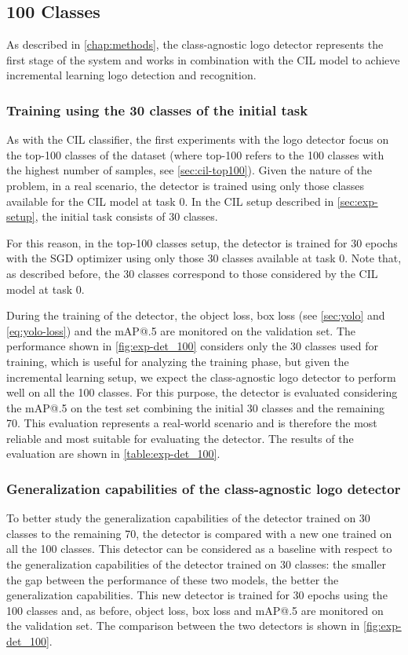 \subsection{100 Classes}

As described in \autoref{chap:methods}, the class-agnostic logo detector represents the first stage of the system and works in combination with the CIL model to achieve incremental learning logo detection and recognition.

\subsubsection{Training using the 30 classes of the initial task}
As with the CIL classifier, the first experiments with the logo detector focus on the top-100 classes of the dataset (where top-100 refers to the 100 classes with the highest number of samples, see \autoref{sec:cil-top100}).
Given the nature of the problem, in a real scenario, the detector is trained using only those classes available for the CIL model at task 0.
In the CIL setup described in \autoref{sec:exp-setup}, the initial task consists of 30 classes.

For this reason, in the top-100 classes setup, the detector is trained for 30 epochs with the SGD optimizer using only those 30 classes available at task 0.
Note that, as described before, the 30 classes correspond to those considered by the CIL model at task 0.

During the training of the detector, the object loss, box loss (see \autoref{sec:yolo} and \autoref{eq:yolo-loss}) and the mAP@.5 are monitored on the validation set.
The performance shown in \autoref{fig:exp-det_100} considers only the 30 classes used for training, which is useful for analyzing the training phase, but given the incremental learning setup, we expect the class-agnostic logo detector to perform well on all the 100 classes.
For this purpose, the detector is evaluated considering the mAP@.5 on the test set combining the initial 30 classes and the remaining 70.
This evaluation represents a real-world scenario and is therefore the most reliable and most suitable for evaluating the detector.
The results of the evaluation are shown in \autoref{table:exp-det_100}.


\subsubsection{Generalization capabilities of the class-agnostic logo detector}
To better study the generalization capabilities of the detector trained on 30 classes to the remaining 70, the detector is compared with a new one trained on all the 100 classes.
This detector can be considered as a baseline with respect to the generalization capabilities of the detector trained on 30 classes: the smaller the gap between the performance of these two models, the better the generalization capabilities.
This new detector is trained for 30 epochs using the 100 classes and, as before, object loss, box loss and mAP@.5 are monitored on the validation set. The comparison between the two detectors is shown in \autoref{fig:exp-det_100}.

